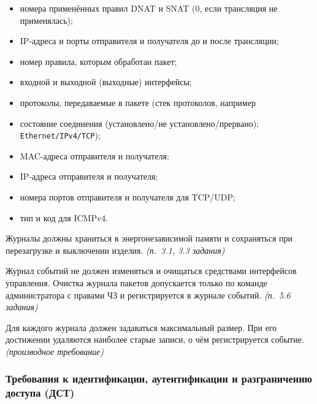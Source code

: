 \documentclass[12pt,a4paper,final]{article}
\newenvironment{reqs}
  {\begin{description}[style=sameline,leftmargin=2.2cm,labelwidth=2.0cm,
     labelsep=0.2cm,font=\normalfont\bfseries,itemsep=3pt]}
  {\end{description}}
\newcommand{\src}[1]{\textit{(п.~#1 задания)}}
\newcommand{\der}{\textit{(производное требование)}}
\begin{document}
\begin{reqs}
\begin{itemize}
      выполненной трансляции (нет, DNAT, SNAT, DNAT и SNAT);
\item номера применённых правил DNAT и SNAT (0, если трансляция не
      применялась);
\item IP-адреса и порты отправителя и получателя до и после трансляции;
  \item номер правила, которым обработан пакет;
  \item входной и выходной (выходные) интерфейсы;
  \item протоколы, передаваемые в пакете (стек протоколов, например
  \item состояние соединения (установлено/не установлено/прервано);
    \texttt{Ethernet/IPv4/TCP});
  \item MAC-адреса отправителя и получателя;
  \item IP-адреса отправителя и получателя;
  \item номера портов отправителя и получателя для TCP/UDP;
  \item тип и код для ICMPv4.
  \end{itemize}
\item[РЕГ-04] Журналы должны храниться в энергонезависимой памяти и сохраняться
  при перезагрузке и выключении изделия. \src{3.1, 3.3}
\item[РЕГ-05] Журнал событий не должен изменяться и очищаться средствами
  интерфейсов управления. Очистка журнала пакетов допускается только по команде
  администратора с правами ЧЗ и регистрируется в журнале событий. \src{5.6}
\item[РЕГ-06] Для каждого журнала должен задаваться максимальный размер. При его
  достижении удаляются наиболее старые записи, о чём регистрируется событие. \der
\end{reqs}

\subsubsection{Требования к идентификации, аутентификации и разграничению доступа (ДСТ)}
\end{document}
